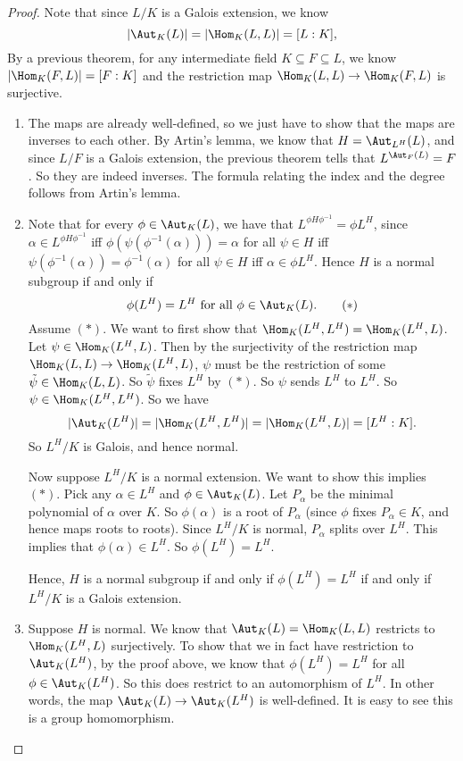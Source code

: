 \documentclass[a4paper]{article}
\begin{document}
\begin{proof}\leavevmode
  Note that since $L/K$ is a Galois extension, we know
  \[
    |\Aut_K(L)| = |\Hom_K(L, L)| = [L:K],
  \]
  By a previous theorem, for any intermediate field $K\subseteq F \subseteq L$, we know $|\Hom_K(F, L)| = [F:K]$ and the restriction map $\Hom_K(L, L) \to \Hom_K(F, L)$ is surjective.

  \begin{enumerate}
    \item The maps are already well-defined, so we just have to show that the maps are inverses to each other. By Artin's lemma, we know that $H = \Aut_{L^H}(L)$, and since $L/F$ is a Galois extension, the previous theorem tells that $L^{\Aut_F (L)} = F$. So they are indeed inverses. The formula relating the index and the degree follows from Artin's lemma.

    \item Note that for every $\phi \in \Aut_K(L)$, we have that $L^{\phi H \phi^{-1}} = \phi L^H$, since $\alpha \in L^{\phi H \phi^{-1}}$ iff $\phi (\psi (\phi^{-1} (\alpha))) = \alpha$ for all $\psi \in H$ iff $\psi (\phi^{-1}(\alpha)) = \phi^{-1}(\alpha)$ for all $\psi \in H$ iff $\alpha \in \phi L^H$. Hence $H$ is a normal subgroup if and only if
      \[
        \phi(L^H) = L^H\text{ for all }\phi \in \Aut_K(L).\tag{$*$}
      \]
      Assume $(*)$. We want to first show that $\Hom_K(L^H, L^H) = \Hom_K(L^H, L)$. Let $\psi \in \Hom_K(L^H, L)$. Then by the surjectivity of the restriction map $\Hom_K(L, L) \to \Hom_K(L^H, L)$, $\psi$ must be the restriction of some $\tilde{\psi} \in \Hom_K(L, L)$. So $\tilde{\psi}$ fixes $L^H$ by $(*)$. So $\psi$ sends $L^H$ to $L^H$. So $\psi \in \Hom_K(L^H, L^H)$. So we have
      \[
        |\Aut_K(L^H)| = |\Hom_K(L^H, L^H)| = |\Hom_K(L^H, L)| = [L^H:K].
      \]
      So $L^H/K$ is Galois, and hence normal.

      Now suppose $L^H/K$ is a normal extension. We want to show this implies $(*)$. Pick any $\alpha \in L^H$ and $\phi\in \Aut_K(L)$. Let $P_\alpha$ be the minimal polynomial of $\alpha$ over $K$. So $\phi(\alpha)$ is a root of $P_\alpha$ (since $\phi$ fixes $P_\alpha \in K$, and hence maps roots to roots). Since $L^H/K$ is normal, $P_\alpha$ splits over $L^H$. This implies that $\phi(\alpha) \in L^H$. So $\phi(L^H) = L^H$.

      Hence, $H$ is a normal subgroup if and only if $\phi(L^H) = L^H$ if and only if $L^H/K$ is a Galois extension.
    \item Suppose $H$ is normal. We know that $\Aut_K(L) = \Hom_K(L, L)$ restricts to $\Hom_K(L^H, L)$ surjectively. To show that we in fact have restriction to $\Aut_K(L^H)$, by the proof above, we know that $\phi(L^H) = L^H$ for all $\phi \in \Aut_K(L^H)$. So this does restrict to an automorphism of $L^H$. In other words, the map $\Aut_K(L) \to \Aut_K(L^H)$ is well-defined. It is easy to see this is a group homomorphism.


\end{enumerate}
\end{proof}
\end{document}
